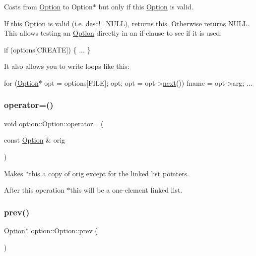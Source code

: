 Casts from \hyperlink{classoption_1_1Option}{Option} to Option$\ast$ but only if this \hyperlink{classoption_1_1Option}{Option} is valid. 

If this \hyperlink{classoption_1_1Option}{Option} is valid (i.\+e. {\ttfamily desc!=N\+U\+LL}), returns this. Otherwise returns N\+U\+LL. This allows testing an \hyperlink{classoption_1_1Option}{Option} directly in an if-\/clause to see if it is used\+: 
\begin{DoxyCode}
\textcolor{keywordflow}{if} (options[CREATE])
\{
  ...
\}
\end{DoxyCode}
 It also allows you to write loops like this\+: 
\begin{DoxyCode}
\textcolor{keywordflow}{for} (\hyperlink{classoption_1_1Option_aa2810152fc23b14175b115d1a7d38095}{Option}* opt = options[FILE]; opt; opt = opt->\hyperlink{classoption_1_1Option_a59ae9aed505f4d410633bb36478a32be}{next}())
 fname = opt->arg; ... 
\end{DoxyCode}
 \mbox{\label{classoption_1_1Option_adb4b44f3778df8f28a04c48bd1b4a72b}} 
\subsubsection{\texorpdfstring{operator=()}{operator=()}}
{\footnotesize\ttfamily void option\+::\+Option\+::operator= (\begin{DoxyParamCaption}\item[{const \hyperlink{classoption_1_1Option}{Option} \&}]{orig }\end{DoxyParamCaption})\hspace{0.3cm}{\ttfamily [inline]}}



Makes {\ttfamily $\ast$this} a copy of {\ttfamily orig} except for the linked list pointers. 

After this operation {\ttfamily $\ast$this} will be a one-\/element linked list. \mbox{\label{classoption_1_1Option_a4d12001a91b0b35cf47437d0c60d2b52}} 
\subsubsection{\texorpdfstring{prev()}{prev()}}
{\footnotesize\ttfamily \hyperlink{classoption_1_1Option}{Option}$\ast$ option\+::\+Option\+::prev (\begin{DoxyParamCaption}{ }\end{DoxyParamCaption})\hspace{0.3cm}{\ttfamily [inline]}}



